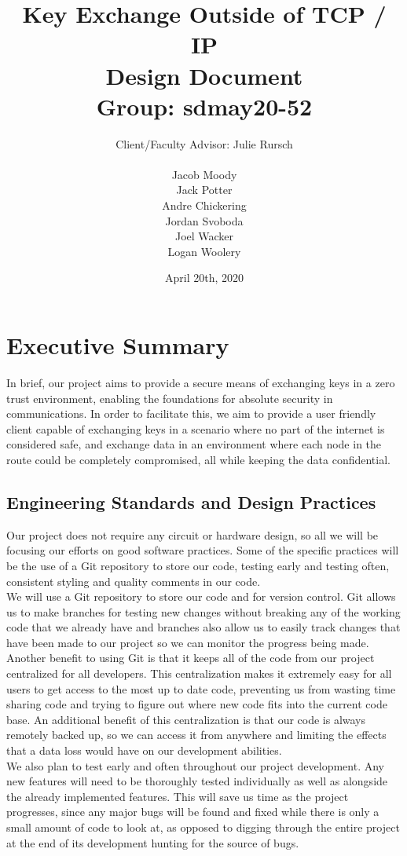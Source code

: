 \documentclass[11pt]{article}
\title{\textbf{Key Exchange Outside of TCP / IP}\\ 
{\normalsize Design Document} \\
{\normalsize Group: sdmay20-52}}
\author{Client/Faculty Advisor: Julie Rursch\\
\\
		Jacob Moody\\
		Jack Potter\\
		Andre Chickering\\
		Jordan Svoboda\\
		Joel Wacker\\
		Logan Woolery
}
\date{April 20th, 2020}
\begin{document}
\maketitle
\newpage
\section*{Executive Summary}

In brief, our project aims to provide a secure means of exchanging keys in a zero trust environment, enabling the foundations for absolute security in communications. In order to facilitate this, we aim to provide a user friendly client capable of exchanging keys in a scenario where no part of the internet is considered safe, and exchange data in an environment where each node in the route could be completely compromised, all while keeping the data confidential.

\subsection*{Engineering Standards and Design Practices}
Our project does not require any circuit or hardware design, so all we will be focusing our efforts on good software practices. Some of the specific practices will be the use of a Git repository to store our code, testing early and testing often, consistent styling and quality comments in our code. \\

We will use a Git repository to store our code and for version control. Git allows us to make branches for testing new changes without breaking any of the working code that we already have and branches also allow us to easily track changes that have been made to our project so we can monitor the progress being made. Another benefit to using Git is that it keeps all of the code from our project centralized for all developers. This centralization makes it extremely easy for all users to get access to the most up to date code, preventing us from wasting time sharing code and trying to figure out where new code fits into the current code base. An additional benefit of this centralization is that our code is always remotely backed up, so we can access it from anywhere and limiting the effects that a data loss would have on our development abilities. \\

We also plan to test early and often throughout our project development. Any new features will need to be thoroughly tested individually as well as alongside the already implemented features. This will save us time as the project progresses, since any major bugs will be found and fixed while there is only a small amount of code to look at, as opposed to digging through the entire project at the end of its development hunting for the source of bugs. \\
\end{document}
